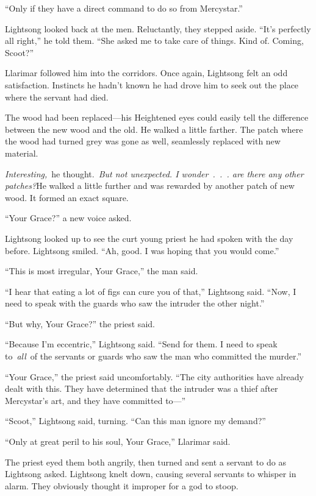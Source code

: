 “Only if they have a direct command to do so from Mercystar.”

Lightsong looked back at the men. Reluctantly, they stepped aside. “It’s perfectly all right,” he told them. “She asked me to take care of things. Kind of. Coming, Scoot?”

Llarimar followed him into the corridors. Once again, Lightsong felt an odd satisfaction. Instincts he hadn’t known he had drove him to seek out the place where the servant had died.

The wood had been replaced—his Heightened eyes could easily tell the difference between the new wood and the old. He walked a little farther. The patch where the wood had turned grey was gone as well, seamlessly replaced with new material.

\textit{Interesting,}~he thought.~\textit{But not unexpected. I wonder~.~.~. are there any other patches?}He walked a little further and was rewarded by another patch of new wood. It formed an exact square.

“Your Grace?” a new voice asked.

Lightsong looked up to see the curt young priest he had spoken with the day before. Lightsong smiled. “Ah, good. I was hoping that you would come.”

“This is most irregular, Your Grace,” the man said.

“I hear that eating a lot of figs can cure you of that,” Lightsong said. “Now, I need to speak with the guards who saw the intruder the other night.”

“But why, Your Grace?” the priest said.

“Because I’m eccentric,” Lightsong said. “Send for them. I need to speak to~\textit{all}~of the servants or guards who saw the man who committed the murder.”

“Your Grace,” the priest said uncomfortably. “The city authorities have already dealt with this. They have determined that the intruder was a thief after Mercystar’s art, and they have committed to—”

“Scoot,” Lightsong said, turning. “Can this man ignore my demand?”

“Only at great peril to his soul, Your Grace,” Llarimar said.

The priest eyed them both angrily, then turned and sent a servant to do as Lightsong asked. Lightsong knelt down, causing several servants to whisper in alarm. They obviously thought it improper for a god to stoop.

